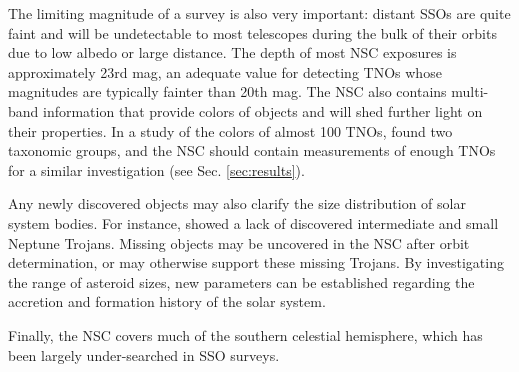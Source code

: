 \documentclass[twocolumn]{aastex62}
\begin{document}

The limiting magnitude of a survey is also very important: distant SSOs are quite faint and will be undetectable to most telescopes during the bulk of their orbits due to low albedo or large distance.  The depth of most NSC exposures is approximately 23rd mag, an adequate value for detecting TNOs whose magnitudes are typically fainter than 20th mag. The NSC also contains multi-band information that provide colors of objects and will shed further light on their properties.  In a study of the colors of almost 100 TNOs, \cite{schwamb19} found two taxonomic groups, and the NSC should contain measurements of enough TNOs for a similar investigation (see  Sec. \ref{sec:results}). 


Any newly discovered objects may also clarify the size distribution of solar system bodies.  For instance, \cite{Shep2010} showed a lack of discovered intermediate and small Neptune Trojans.  Missing objects may be uncovered in the NSC after orbit determination, or may otherwise support these missing Trojans.  By investigating the range of asteroid sizes, new parameters can be established regarding the accretion and formation history of the solar system.


Finally, the NSC covers much of the southern celestial hemisphere, which has been largely under-searched in SSO surveys.  
\end{document}
